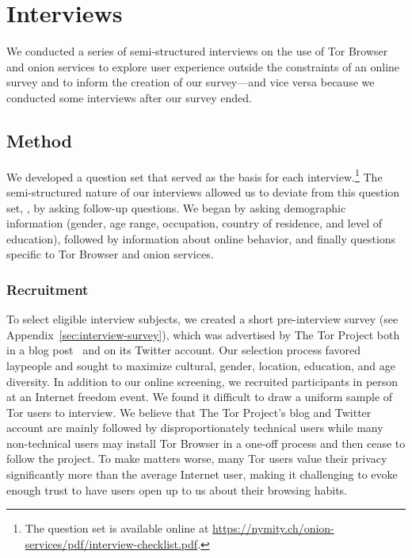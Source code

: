 \section{Interviews}
\label{sec:interviews}

We conducted a series of semi-structured interviews on the use of Tor Browser
and onion services to \first explore user experience outside the constraints of
an online survey and to \second inform the creation of our survey---and vice
versa because we conducted some interviews after our survey ended.

\subsection{Method}

We developed a question set that served as the basis for each
interview.\footnote{The question set is available online at
\url{https://nymity.ch/onion-services/pdf/interview-checklist.pdf}.}  The
semi-structured nature of our interviews allowed us to deviate from this
question set, \eg, by asking follow-up questions.  We began by asking
demographic information (gender, age range, occupation, country of residence,
and level of education), followed by information about online behavior, and
finally questions specific to Tor Browser and onion services.

\subsubsection{Recruitment}

To select eligible interview subjects, we created a short pre-interview survey
(see Appendix~\ref{sec:interview-survey}), which was advertised by The Tor
Project both in a blog post~\cite{Winter2017a} and on its Twitter account.  Our
selection process favored laypeople and sought to maximize cultural, gender,
location, education, and age diversity.  In addition to our online screening, we
recruited participants in person at an Internet freedom event.  We found it
difficult to draw a uniform sample of Tor users to interview. We believe that
The Tor Project's blog and Twitter account are mainly followed by
disproportionately technical users while many non-technical users may install
Tor Browser in a one-off process and then cease to follow the project.  To make
matters worse, many Tor users value their privacy significantly more than the
average Internet user, making it challenging to evoke enough trust to have users
open up to us about their browsing habits.

